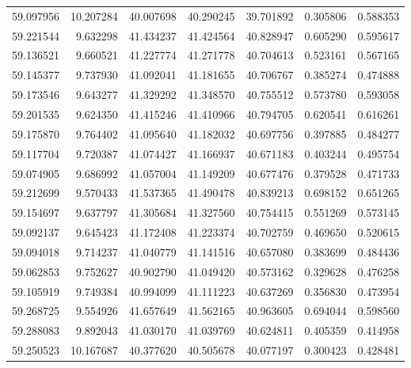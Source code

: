 \begin{tabular}{rrrrrrr}
 59.097956 &  10.207284 &         40.007698 &         40.290245 &         39.701892 &  0.305806 &  0.588353 \\
 59.221544 &   9.632298 &         41.434237 &         41.424564 &         40.828947 &  0.605290 &  0.595617 \\
 59.136521 &   9.660521 &         41.227774 &         41.271778 &         40.704613 &  0.523161 &  0.567165 \\
 59.145377 &   9.737930 &         41.092041 &         41.181655 &         40.706767 &  0.385274 &  0.474888 \\
 59.173546 &   9.643277 &         41.329292 &         41.348570 &         40.755512 &  0.573780 &  0.593058 \\
 59.201535 &   9.624350 &         41.415246 &         41.410966 &         40.794705 &  0.620541 &  0.616261 \\
 59.175870 &   9.764402 &         41.095640 &         41.182032 &         40.697756 &  0.397885 &  0.484277 \\
 59.117704 &   9.720387 &         41.074427 &         41.166937 &         40.671183 &  0.403244 &  0.495754 \\
 59.074905 &   9.686992 &         41.057004 &         41.149209 &         40.677476 &  0.379528 &  0.471733 \\
 59.212699 &   9.570433 &         41.537365 &         41.490478 &         40.839213 &  0.698152 &  0.651265 \\
 59.154697 &   9.637797 &         41.305684 &         41.327560 &         40.754415 &  0.551269 &  0.573145 \\
 59.092137 &   9.645423 &         41.172408 &         41.223374 &         40.702759 &  0.469650 &  0.520615 \\
 59.094018 &   9.714237 &         41.040779 &         41.141516 &         40.657080 &  0.383699 &  0.484436 \\
 59.062853 &   9.752627 &         40.902790 &         41.049420 &         40.573162 &  0.329628 &  0.476258 \\
 59.105919 &   9.749384 &         40.994099 &         41.111223 &         40.637269 &  0.356830 &  0.473954 \\
 59.268725 &   9.554926 &         41.657649 &         41.562165 &         40.963605 &  0.694044 &  0.598560 \\
 59.288083 &   9.892043 &         41.030170 &         41.039769 &         40.624811 &  0.405359 &  0.414958 \\
 59.250523 &  10.167687 &         40.377620 &         40.505678 &         40.077197 &  0.300423 &  0.428481 \\

\end{tabular}
